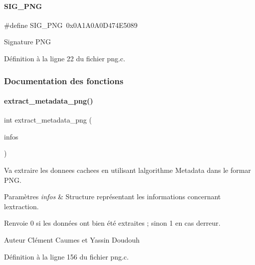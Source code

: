 \paragraph{\texorpdfstring{S\+I\+G\+\_\+\+P\+NG}{SIG\_PNG}}
{\footnotesize\ttfamily \#define S\+I\+G\+\_\+\+P\+NG~0x0\+A1\+A0\+A0\+D474\+E5089}

Signature P\+NG 

Définition à la ligne 22 du fichier png.\+c.



\subsubsection{Documentation des fonctions}
\mbox{\label{a00092_a258c2aefc0d29e112eca90e652730a84}} 
\paragraph{\texorpdfstring{extract\+\_\+metadata\+\_\+png()}{extract\_metadata\_png()}}
{\footnotesize\ttfamily int extract\+\_\+metadata\+\_\+png (\begin{DoxyParamCaption}\item[{\hyperlink{a00008_aa8ca908d92fb5bdd3c0a9e1f58b2cf03}{info\+\_\+s} $\ast$}]{infos }\end{DoxyParamCaption})}



Va extraire les donnees cachees en utilisant l\textquotesingle{}algorithme Metadata dans le formar P\+NG. 


\begin{DoxyParams}{Paramètres}
{\em infos} & Structure représentant les informations concernant l\textquotesingle{}extraction. \\
\hline
\end{DoxyParams}
\begin{DoxyReturn}{Renvoie}
0 si les données ont bien été extraites ; sinon 1 en cas d\textquotesingle{}erreur. 
\end{DoxyReturn}
\begin{DoxyAuthor}{Auteur}
Clément Caumes et Yassin Doudouh 
\end{DoxyAuthor}


Définition à la ligne 156 du fichier png.\+c.

